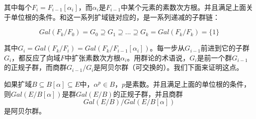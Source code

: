 \documentclass[b5paper]{ctexart}
\begin{document}
其中每个$F_i = F_{i-1}[\alpha_i]$，而$\alpha_i$是$F_{i-1}$中某个元素的素数次方根。并且满足上面关于单位根的条件。和这一系列扩域链对应的，是一系列递减的子群链：

\[
Gal(F_k/F_0) = G_0 \supseteq G_1 \supseteq ... \supseteq G_k = Gal(F_k/F_k) = \{1\}
\]

其中$G_i = Gal(F_k/F_i) = Gal(F_k/F_{i-1}[\alpha_i])$。每一步从$G_{i-1}$前进到它的子群$G_i$，都反应了向域$F$中扩张素数次方根$\alpha_i$。用群论的术语说，$G_i$是前一个群$G_{i-1}$的正规子群，而商群$G_{i-1}/G_i$是阿贝尔群（可交换的）。我们下面来证明这点。

\begin{theorem}
如果扩域$B \subseteq B[\alpha] \subseteq E$中，$\alpha^p \in B$，$p$是素数。并且满足上面的单位根的条件，则$Gal(E/B[\alpha])$是群$Gal(E/B)$的正规子群，并且商群
\[
Gal(E/B) / Gal(E/B[\alpha])
\]
是阿贝尔群。
\end{theorem}
\end{document}
